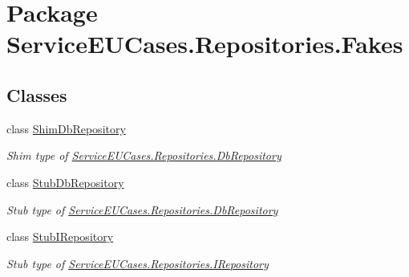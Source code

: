 \hypertarget{namespace_service_e_u_cases_1_1_repositories_1_1_fakes}{\section{Package Service\-E\-U\-Cases.\-Repositories.\-Fakes}
\label{namespace_service_e_u_cases_1_1_repositories_1_1_fakes}
}
\subsection*{Classes}
\begin{DoxyCompactItemize}
\item 
class \hyperlink{class_service_e_u_cases_1_1_repositories_1_1_fakes_1_1_shim_db_repository}{Shim\-Db\-Repository}
\begin{DoxyCompactList}\small\item\em Shim type of \hyperlink{class_service_e_u_cases_1_1_repositories_1_1_db_repository}{Service\-E\-U\-Cases.\-Repositories.\-Db\-Repository}\end{DoxyCompactList}\item 
class \hyperlink{class_service_e_u_cases_1_1_repositories_1_1_fakes_1_1_stub_db_repository}{Stub\-Db\-Repository}
\begin{DoxyCompactList}\small\item\em Stub type of \hyperlink{class_service_e_u_cases_1_1_repositories_1_1_db_repository}{Service\-E\-U\-Cases.\-Repositories.\-Db\-Repository}\end{DoxyCompactList}\item 
class \hyperlink{class_service_e_u_cases_1_1_repositories_1_1_fakes_1_1_stub_i_repository}{Stub\-I\-Repository}
\begin{DoxyCompactList}\small\item\em Stub type of \hyperlink{interface_service_e_u_cases_1_1_repositories_1_1_i_repository}{Service\-E\-U\-Cases.\-Repositories.\-I\-Repository}\end{DoxyCompactList}\end{DoxyCompactItemize}
